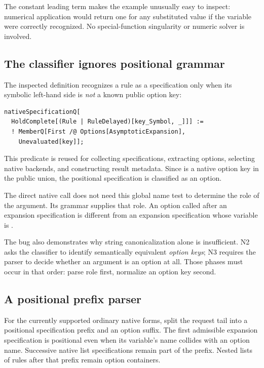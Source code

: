 \documentclass[11pt,a4paper]{article}
\newcommand{\code}[1]{\texttt{\detokenize{#1}}}
\begin{document}
The constant leading term makes the example unusually easy to inspect: numerical application would return one for any substituted value if the variable were correctly recognized. No special-function singularity or numeric solver is involved.

\subsection{The classifier ignores positional grammar}

The inspected definition recognizes a rule as a specification only when its symbolic left-hand side is \emph{not} a known public option key:
\begin{lstlisting}
nativeSpecificationQ[
  HoldComplete[(Rule | RuleDelayed)[key_Symbol, _]]] :=
  ! MemberQ[First /@ Options[AsymptoticExpansion],
    Unevaluated[key]];
\end{lstlisting}
This predicate is reused for collecting specifications, extracting options, selecting native backends, and constructing result metadata. Since \code{Method} is a native option key in the public union, the positional specification \code{Method -> 0} is classified as an option.

The direct native call does not need this global name test to determine the role of the argument. Its grammar supplies that role. An option called \code{Method} after an expansion specification is different from an expansion specification whose variable is \code{Method}.

The bug also demonstrates why string canonicalization alone is insufficient. N2 asks the classifier to identify semantically equivalent \emph{option keys}; N3 requires the parser to decide whether an argument is an option at all. Those phases must occur in that order: parse role first, normalize an option key second.

\subsection{A positional prefix parser}

For the currently supported ordinary native forms, split the request tail into a positional specification prefix and an option suffix. The first admissible expansion specification is positional even when its variable's name collides with an option name. Successive native list specifications remain part of the prefix. Nested lists of rules after that prefix remain option containers.
\end{document}
